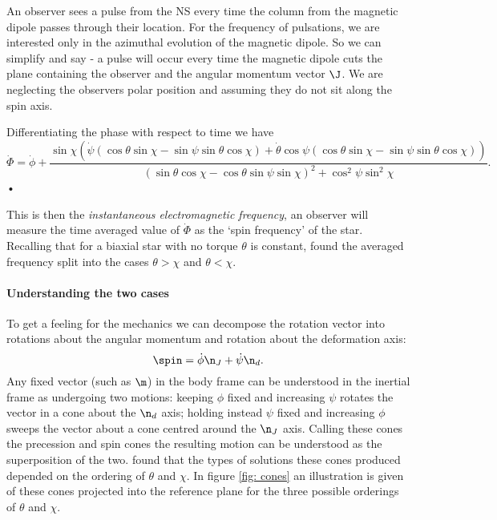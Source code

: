\documentclass[/home/greg/Thesis/main/main.tex]{subfiles}
\begin{document}
An observer sees a pulse from the NS every time the column from the magnetic
dipole passes through their location. For the frequency of pulsations, we are
interested only in the azimuthal evolution of the magnetic dipole. So we can 
simplify and say - a pulse
will occur every time the magnetic dipole cuts the plane containing the observer
and the angular momentum vector $\J$. We are neglecting the observers polar
position and assuming they do not sit along the spin axis.

Differentiating the phase with respect to time we have
\begin{equation}
\dot{\Phi} = \dot{\phi} 
+ \frac{\sin\chi \left(
\dot{\psi} (\cos\theta\sin\chi - \sin \psi \sin \theta \cos\chi) + 
\dot{\theta} \cos\psi (\cos\theta\sin\chi - \sin \psi \sin \theta \cos\chi)\right) 
}{(\sin\theta \cos \chi - \cos \theta \sin \psi \sin \chi)^{2} + \cos^{2}\psi \sin^{2} \chi}.
\label{eqn: Phi_dot}
\end{equation}•

This is then the \emph{instantaneous electromagnetic frequency}, an observer
will measure the time averaged value of $\dot{\Phi}$ as the `spin frequency' of
the star. Recalling that for a biaxial star with no torque $\theta$ is constant,
\citet{Jones2001} found the averaged frequency split into the cases 
$\theta > \chi$ and $\theta < \chi$.

\paragraph{Understanding the two cases}
To get a feeling for the mechanics we can decompose the rotation vector into 
rotations about the angular momentum and rotation about the deformation axis:
\begin{equation}
  \spin = \dot{\phi}\n_{J} + \dot{\psi}\n_{d}.
\label{eqn: decomp}
\end{equation}
Any fixed vector (such as $\m$) in the body frame can be understood in the
inertial frame as undergoing two motions: keeping $\phi$ fixed and increasing
$\psi$ rotates the vector in a cone about the $\n_{d}$ axis; holding instead
$\psi$ fixed and increasing $\phi$ sweeps the vector about a cone centred
around the $\n_{J}$ axis. Calling these cones the precession and spin cones
the resulting motion can be understood as the superposition of the
two. \citet{Jones2001} found that the types of solutions these cones produced
depended on the ordering of $\theta$ and $\chi$. In figure \ref{fig: cones} an 
illustration is given of these cones
projected into the reference plane for the three possible orderings of $\theta$
and $\chi$. 
\end{document}
